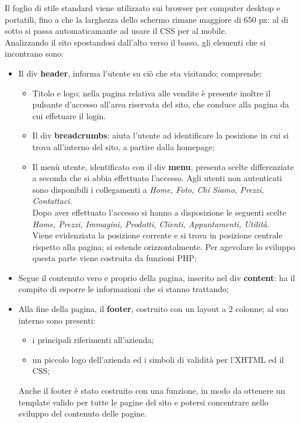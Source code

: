 {{		Il foglio di stile standard viene utilizzato sui browser per computer desktop e portatili, fino a che la larghezza dello schermo rimane maggiore di 650 px: al di sotto si passa automaticamante ad usare il CSS per al mobile.
		\\
		Analizzando il sito spostandosi dall'alto verso il basso, gli elementi che si incontrano sono:
		\begin{itemize}\itemsep1pt
			\item Il div \textbf{header}, informa l'utente su ciò che sta visitando; comprende:
			\begin{itemize}\itemsep1pt
				\item Titolo e logo; nella pagina relativa alle vendite è presente inoltre il pulsante d'accesso all'area riservata del sito, che conduce alla pagina da cui effetuare il login.
				\item Il div \textbf{breadcrumbs}: aiuta l'utente ad identificare la posizione in cui si trova all'interno del sito, a partire dalla homepage;
				\item Il menù utente, identificato con il div \textbf{menu}, presenta scelte differenziate a seconda che si abbia effettuato l'accesso. Agli utenti non autenticati sono disponibili i collegamenti a \textit{Home, Foto, Chi Siamo, Prezzi, Contattaci}.\\ 
				Dopo aver effettuato l'accesso si hanno a disposizione le seguenti scelte \textit{Home, Prezzi, Immagini, Prodotti, Clienti, Appuntamenti, Utilità}.\\
				Viene evidenziata la posizione corrente e si trova in posizione centrale rispetto alla pagina; si estende orizzontalmente.
				Per agevolare lo sviluppo questa parte viene costruita da funzioni PHP;
			\end{itemize}
			\item Segue il contenuto vero e proprio della pagina, inserito nel div \textbf{content}: ha il compito di esporre le informazioni che si stanno trattando;
			\item Alla fine della pagina, il \textbf{footer}, costruito con un layout a 2 colonne; al suo interno sono presenti:
			\begin{itemize}\itemsep1pt
				\item i principali riferimenti all'azienda;
				\item un piccolo logo dell'azienda ed i simboli di validità per l'XHTML ed il CSS;
			\end{itemize}
			Anche il footer è stato costruito con una funzione, in modo da ottenere un template valido per tutte le pagine del sito e potersi concentrare nello sviluppo del contenuto delle pagine.
		\end{itemize}
		}
}
